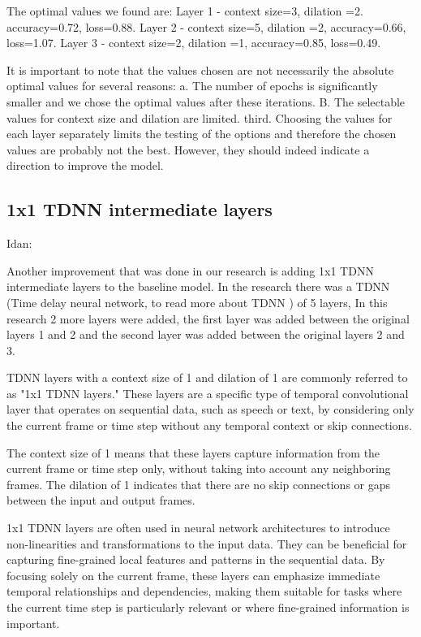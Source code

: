 \documentclass[a4paper]{article}
\begin{document}
The optimal values we found are:
Layer 1 - context size=3, dilation =2. accuracy=0.72, loss=0.88.
Layer 2 - context size=5, dilation =2, accuracy=0.66, loss=1.07.
Layer 3 - context size=2, dilation =1, accuracy=0.85, loss=0.49.

It is important to note that the values chosen are not necessarily the absolute optimal values for several reasons: a. The number of epochs is significantly smaller and we chose the optimal values after these iterations. B. The selectable values for context size and dilation are limited. third. Choosing the values for each layer separately limits the testing of the options and therefore the chosen values are probably not the best. However, they should indeed indicate a direction to improve the model.

\subsection{1x1 TDNN intermediate layers}

Idan:

Another improvement that was done in our research is adding 1x1 TDNN intermediate layers to the baseline model\cite{david2018spoken}. In the research there was a TDNN (Time delay neural network, to read more about TDNN \cite{peddinti2015time}) of 5 layers, In this research 2 more layers were added, the first layer was added between the original layers 1 and 2 and the second layer was added between the original layers 2 and 3.

TDNN layers with a context size of 1 and dilation of 1 are commonly referred to as "1x1 TDNN layers." These layers are a specific type of temporal convolutional layer that operates on sequential data, such as speech or text, by considering only the current frame or time step without any temporal context or skip connections.

The context size of 1 means that these layers capture information from the current frame or time step only, without taking into account any neighboring frames. The dilation of 1 indicates that there are no skip connections or gaps between the input and output frames.

1x1 TDNN layers are often used in neural network architectures to introduce non-linearities and transformations to the input data. They can be beneficial for capturing fine-grained local features and patterns in the sequential data. By focusing solely on the current frame, these layers can emphasize immediate temporal relationships and dependencies, making them suitable for tasks where the current time step is particularly relevant or where fine-grained information is important.
\end{document}
